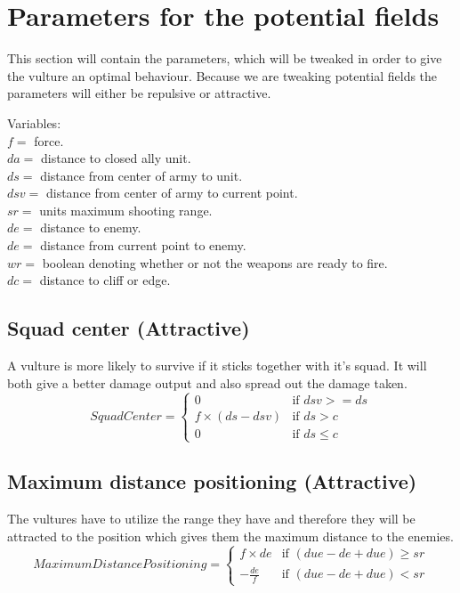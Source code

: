 \section{Parameters for the potential fields}
	This section will contain the parameters, which will be tweaked in order to give the vulture an optimal behaviour. Because we are tweaking 
	potential fields the parameters will either be repulsive or attractive.
	
	Variables:\\
	$f =$ force.\\
	$da =$ distance to closed ally unit.\\
	$ds =$ distance from center of army to unit.\\
	$dsv =$ distance from center of army to current point.\\
	$sr =$ units maximum shooting range.\\
	$de =$ distance to enemy.\\
	$de =$ distance from current point to enemy.\\
	$wr =$ boolean denoting whether or not the weapons are ready to fire.\\
	$dc =$ distance to cliff or edge.
	
	\subsection*{Squad center (Attractive)}
		A vulture is more likely to survive if it sticks together with it's squad. It will both give a better damage output and also spread out the 
		damage taken.
		\begin{displaymath}
			SquadCenter  = \begin{cases}
					0 & \text{if } dsv >= ds\\
					f \times (ds - dsv) & \text{if } ds > c\\
					0 & \text{if } ds \leq c
				\end{cases}		
		\end{displaymath}
		
		
	\subsection*{Maximum distance positioning (Attractive)}
		The vultures have to utilize the range they have and therefore they will be attracted to the position which gives them the maximum distance 
		to the enemies.
		\begin{displaymath}
			MaximumDistancePositioning = \begin{cases}
					f \times de & \text{if } (due - de + due) \geq sr\\
					- \frac{de}{f} & \text{if } (due - de + due) < sr
				\end{cases}		
		\end{displaymath}
